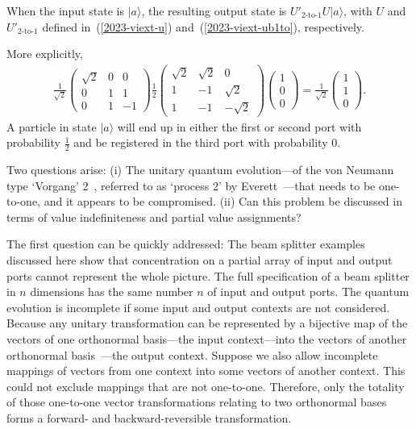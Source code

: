 \documentclass[%
 superscriptaddress,
  preprint,
 showpacs,
 showkeys,
 nofootinbib,
  amsmath,amssymb,
 pra,
  longbibliography,
  floatfix,
 ]{revtex4-2}
\theoremstyle{definition}
\begin{document}
When the input state is $\vert a \rangle$, the resulting output state is  $U'_{\text{2-to-1}}U\vert a \rangle$, with $U$ and $U'_{\text{2-to-1}}$ defined in~(\ref{2023-viext-u}) and~(\ref{2023-viext-ub1to}), respectively.

More explicitly,
\begin{equation*}
\begin{split}
\frac{1}{\sqrt{2}}
\begin{pmatrix}
\sqrt{2}&0&0\\
0&1&1 \\
0&1&-1
\end{pmatrix}
%
 \frac12
\begin{pmatrix}
\sqrt{2} &  \sqrt{2}& 0\\
1& -1&  \sqrt{2} \\
1& -1& - \sqrt{2}
\end{pmatrix}
%
\begin{pmatrix}
1\\
0 \\
0
\end{pmatrix}
=
 \frac{1}{\sqrt{2}}
\begin{pmatrix}
1\\
1 \\
0
\end{pmatrix}
.
\end{split}
\end{equation*}
 A particle in state $\vert a \rangle$ will end up in either the first or second port with probability $\frac{1}{2}$ and be registered in the third port with probability 0.


Two questions arise:
(i)
The unitary quantum evolution---of the von Neumann type `Vorgang' 2~\cite{v-neumann-49,v-neumann-55}, referred to as `process 2' by Everett~\cite{everett}---that
needs to be one-to-one, and it appears to be compromised.
(ii)
Can this problem be discussed in terms of value indefiniteness and partial value assignments?


The first question can be quickly addressed:
The beam splitter examples discussed here show that concentration on a partial array of input and output ports cannot represent the whole picture.
The full specification of a beam splitter in $n$ dimensions has the same number $n$ of input and output ports.
The quantum evolution is incomplete if some input and output contexts are not considered.
Because any unitary transformation can be represented by a bijective map of the vectors
of one orthonormal basis---the input context---into the vectors of another orthonormal basis~\cite{Schwinger.60,Joglekar-I}---the output context.
Suppose we also allow incomplete mappings of vectors from one context into some vectors of another context. This could not exclude mappings that are not one-to-one. Therefore,
only the totality of those one-to-one vector transformations relating to two orthonormal bases forms a forward- and backward-reversible transformation.
\end{document}
